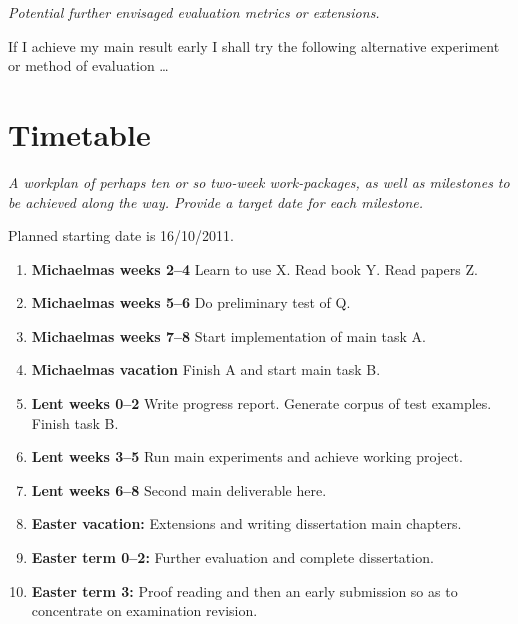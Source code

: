 \documentclass[12pt,a4paper,twoside]{article}
\begin{document}
{\em Potential further envisaged evaluation metrics or extensions.}

If I achieve my main result early I shall try the following
alternative experiment or method of evaluation \ldots


\section*{Timetable}

\emph{A workplan of perhaps ten or so two-week work-packages,
as well as milestones to be achieved along the way. Provide a
target date for each milestone.}

Planned starting date is 16/10/2011.

\begin{enumerate}

\item \textbf{Michaelmas weeks 2--4} Learn to use X. Read book Y. Read papers Z.

\item \textbf{Michaelmas weeks 5--6} Do preliminary test of Q.

\item \textbf{Michaelmas weeks 7--8} Start implementation of main task A.

\item \textbf{Michaelmas vacation} Finish A and start main task B.

\item \textbf{Lent weeks 0--2} Write progress report. Generate corpus of
  test examples. Finish task B.

\item \textbf{Lent weeks 3--5} Run main experiments and achieve working project.

\item \textbf{Lent weeks 6--8} Second main deliverable here.

\item \textbf{Easter vacation:} Extensions and writing dissertation main
  chapters.

\item \textbf{Easter term 0--2:}  Further evaluation and complete dissertation.

\item \textbf{Easter term 3:} Proof reading and then an early submission
  so as to concentrate on examination revision.

\end{enumerate}
\end{document}
